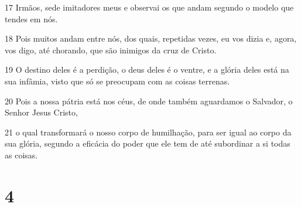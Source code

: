 \par 17 Irmãos, sede imitadores meus e observai os que andam segundo o modelo que tendes em nós.
\par 18 Pois muitos andam entre nós, dos quais, repetidas vezes, eu vos dizia e, agora, vos digo, até chorando, que são inimigos da cruz de Cristo.
\par 19 O destino deles é a perdição, o deus deles é o ventre, e a glória deles está na sua infâmia, visto que só se preocupam com as coisas terrenas.
\par 20 Pois a nossa pátria está nos céus, de onde também aguardamos o Salvador, o Senhor Jesus Cristo,
\par 21 o qual transformará o nosso corpo de humilhação, para ser igual ao corpo da sua glória, segundo a eficácia do poder que ele tem de até subordinar a si todas as coisas.

\chapter{4}

